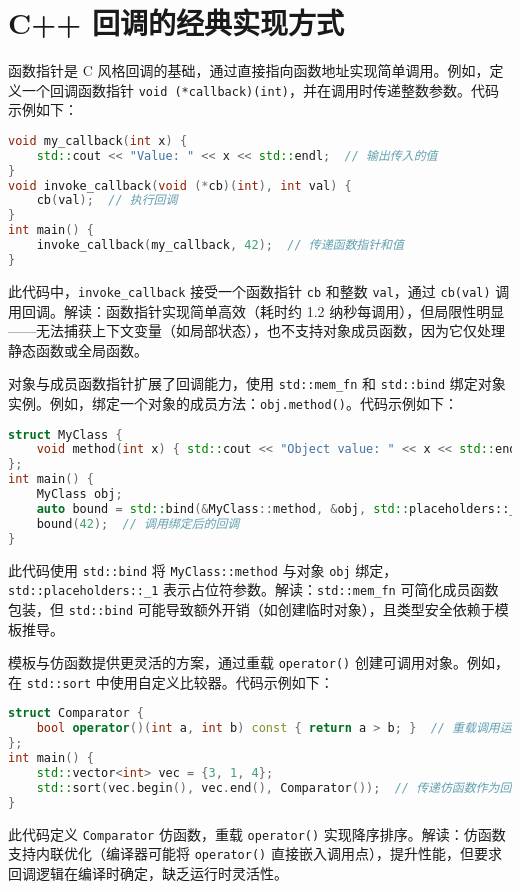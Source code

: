 \chapter{C++ 回调的经典实现方式}
函数指针是 C 风格回调的基础，通过直接指向函数地址实现简单调用。例如，定义一个回调函数指针 \texttt{void (*callback)(int)}，并在调用时传递整数参数。代码示例如下：\par
\begin{lstlisting}[language=cpp]
void my_callback(int x) {  
    std::cout << "Value: " << x << std::endl;  // 输出传入的值  
}  
void invoke_callback(void (*cb)(int), int val) {  
    cb(val);  // 执行回调  
}  
int main() {  
    invoke_callback(my_callback, 42);  // 传递函数指针和值  
}  
\end{lstlisting}
此代码中，\texttt{invoke\_{}callback} 接受一个函数指针 \texttt{cb} 和整数 \texttt{val}，通过 \texttt{cb(val)} 调用回调。解读：函数指针实现简单高效（耗时约 1.2 纳秒每调用），但局限性明显——无法捕获上下文变量（如局部状态），也不支持对象成员函数，因为它仅处理静态函数或全局函数。\par
对象与成员函数指针扩展了回调能力，使用 \texttt{std::mem\_{}fn} 和 \texttt{std::bind} 绑定对象实例。例如，绑定一个对象的成员方法：\texttt{obj.method()}。代码示例如下：\par
\begin{lstlisting}[language=cpp]
struct MyClass {  
    void method(int x) { std::cout << "Object value: " << x << std::endl; }  
};  
int main() {  
    MyClass obj;  
    auto bound = std::bind(&MyClass::method, &obj, std::placeholders::_1);  // 绑定对象和成员函数  
    bound(42);  // 调用绑定后的回调  
}  
\end{lstlisting}
此代码使用 \texttt{std::bind} 将 \texttt{MyClass::method} 与对象 \texttt{obj} 绑定，\texttt{std::placeholders::\_{}1} 表示占位符参数。解读：\texttt{std::mem\_{}fn} 可简化成员函数包装，但 \texttt{std::bind} 可能导致额外开销（如创建临时对象），且类型安全依赖于模板推导。\par
模板与仿函数提供更灵活的方案，通过重载 \texttt{operator()} 创建可调用对象。例如，在 \texttt{std::sort} 中使用自定义比较器。代码示例如下：\par
\begin{lstlisting}[language=cpp]
struct Comparator {  
    bool operator()(int a, int b) const { return a > b; }  // 重载调用运算符  
};  
int main() {  
    std::vector<int> vec = {3, 1, 4};  
    std::sort(vec.begin(), vec.end(), Comparator());  // 传递仿函数作为回调  
}  
\end{lstlisting}
此代码定义 \texttt{Comparator} 仿函数，重载 \texttt{operator()} 实现降序排序。解读：仿函数支持内联优化（编译器可能将 \texttt{operator()} 直接嵌入调用点），提升性能，但要求回调逻辑在编译时确定，缺乏运行时灵活性。\par
